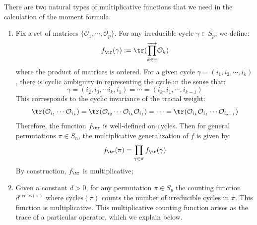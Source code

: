 \documentclass[a4paper,11pt]{article}
\theoremstyle{definition}
\numberwithin{equation}{section}
\begin{document}
There are two natural types of multiplicative functions that we need in the calculation of the moment formula. 
\begin{enumerate}
    \item Fix a set of matrices $\{\mathcal{O}_1,\cdots,\mathcal{O}_p\}$. For any irreducible cycle $\gamma\in S_p$, we define:
    \begin{equation}
        f_{\tr}(\gamma) := \tr(\overrightarrow{\prod_{k\in\gamma}}\mathcal{O}_k)
    \end{equation}
    where the product of matrices is ordered. For a given cycle $\gamma = (i_1,i_2,\cdots,i_k)$, there is cyclic ambiguity in representing the cycle in the sense that:
    \begin{equation}
        \gamma = (i_2,i_3,\cdots i_k,i_1) = \cdots = (i_k,i_1,\cdots,i_{k-1})
    \end{equation}
    This corresponds to the cyclic invariance of the tracial weight:
    \begin{equation}
        \tr(\mathcal{O}_{i_1}\cdots\mathcal{O}_{i_k}) = \tr(\mathcal{O}_{i_2}\cdots\mathcal{O}_{i_k}\mathcal{O}_{i_1}) = \cdots =\tr(\mathcal{O}_{i_k}\mathcal{O}_{i_1}\cdots\mathcal{O}_{i_{k-1}})
    \end{equation}
    Therefore, the function $f_{\tr}$ is well-defined on cycles. Then for general permutations $\pi\in S_n$, the multiplicative generalization of $f$ is given by:
    \begin{equation}
        f_{\tr}(\pi) = \prod_{\gamma\in\pi}f_{\tr}(\gamma)
    \end{equation}
    By construction, $f_{\tr}$ is multiplicative;
    \item Given a constant $d > 0$, for any permutation $\pi \in S_p$ the counting function $d^{\text{cycles}(\pi)}$ where $\text{cycles}(\pi)$ counts the number of irreducible cycles in $\pi$. This function is multiplicative. This multiplicative counting function arises as the trace of a particular operator, which we explain below.


\end{enumerate}
\end{document}
